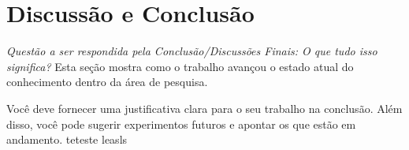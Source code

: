 \section{Discussão e Conclusão}

\emph{Questão a ser respondida pela Conclusão/Discussões Finais: O que tudo isso significa?}
Esta seção mostra como o trabalho avançou o estado atual do conhecimento dentro da área de pesquisa.

Você deve fornecer uma justificativa clara para o seu trabalho na conclusão.  Além disso, você pode sugerir experimentos futuros e apontar os que estão em andamento.
teteste leasls